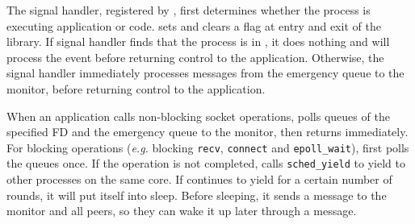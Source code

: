 The signal handler, registered by \libipc{}, first determines whether the process is executing application or \libipc{} code. \libipc{} sets and clears a flag at entry and exit of the library. If signal handler finds that the process is in \libipc, it does nothing and \libipc{} will process the event before returning control to the application. Otherwise, the signal handler immediately processes messages from the emergency queue to the monitor, before returning control to the application. 

When an application calls non-blocking socket operations, \libipc{} polls queues of the specified FD and the emergency queue to the monitor, then returns immediately. For blocking operations (\textit{e.g.} blocking \texttt{recv}, \texttt{connect} and \texttt{epoll\_wait}), \libipc{} first polls the queues once. If the operation is not completed, \libipc{} calls \texttt{sched\_yield} to yield to other processes on the same core. %
If \libipc{} continues to yield for a certain number of rounds, it will put itself into sleep. Before sleeping, it sends a message to the monitor and all peers, so they can wake it up later through a message.


